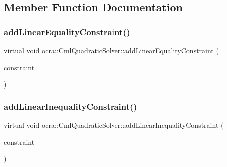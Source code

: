 \subsection{Member Function Documentation}
\hypertarget{classocra_1_1CmlQuadraticSolver_afea0aeb47c39f7fb8b3ce068f3d09885}{}\label{classocra_1_1CmlQuadraticSolver_afea0aeb47c39f7fb8b3ce068f3d09885} 
\subsubsection{\texorpdfstring{add\+Linear\+Equality\+Constraint()}{addLinearEqualityConstraint()}}
{\footnotesize\ttfamily virtual void ocra\+::\+Cml\+Quadratic\+Solver\+::add\+Linear\+Equality\+Constraint (\begin{DoxyParamCaption}\item[{\hyperlink{namespaceocra_ae8b87cf4099be3efc3b410019ad2046e}{Linear\+Constraint} $\ast$}]{constraint }\end{DoxyParamCaption})\hspace{0.3cm}{\ttfamily [virtual]}}

\hypertarget{classocra_1_1CmlQuadraticSolver_a5bbf7066fb72a418a174aece3ac65bf5}{}\label{classocra_1_1CmlQuadraticSolver_a5bbf7066fb72a418a174aece3ac65bf5} 
\subsubsection{\texorpdfstring{add\+Linear\+Inequality\+Constraint()}{addLinearInequalityConstraint()}}
{\footnotesize\ttfamily virtual void ocra\+::\+Cml\+Quadratic\+Solver\+::add\+Linear\+Inequality\+Constraint (\begin{DoxyParamCaption}\item[{\hyperlink{namespaceocra_ae8b87cf4099be3efc3b410019ad2046e}{Linear\+Constraint} $\ast$}]{constraint }\end{DoxyParamCaption})\hspace{0.3cm}{\ttfamily [virtual]}}

